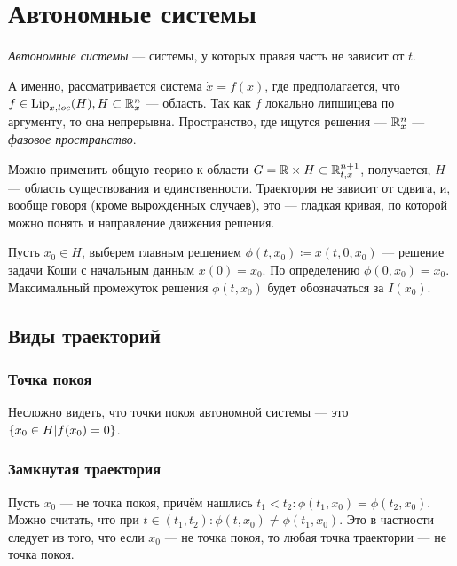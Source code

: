 \documentclass[a4paper]{report}
\begin{document}
    \chapter{Автономные системы}
    \emph{Автономные системы} --- системы, у которых правая часть не зависит от $t$.

    А именно, рассматривается система $\dot{x} = f(x)$, где предполагается, что $f \in \operatorname{Lip}_{x,loc}(H), H \subset \mathbb{R}_x^n$ --- область.
    Так как $f$ локально липшицева по аргументу, то она непрерывна.
    Пространство, где ищутся решения --- $\mathbb{R}^n_x$ --- \emph{фазовое пространство}.

    Можно применить общую теорию к области $G = \mathbb{R} \times H \subset \mathbb{R}_{t,x}^{n + 1}$, получается, $H$ --- область существования и единственности.
    Траектория не зависит от сдвига, и, вообще говоря (кроме вырожденных случаев), это --- гладкая кривая, по которой можно понять и направление движения решения.

    Пусть $x_0 \in H$, выберем главным решением $\phi(t, x_0) \coloneqq x(t, 0, x_0)$ --- решение задачи Коши с начальным данным $x(0) = x_0$.
    По определению $\phi(0, x_0) = x_0$.
    Максимальный промежуток решения $\phi(t, x_0)$ будет обозначаться за $I(x_0)$.
    \section{Виды траекторий}
    \subsection{Точка покоя}
    Несложно видеть, что точки покоя автономной системы --- это $\left\{x_0 \in H\middle|f(x_0) = 0\right\}$.
    \subsection{Замкнутая траектория}
    Пусть $x_0$ --- не точка покоя, причём нашлись $t_1 < t_2: \phi(t_1, x_0) = \phi(t_2, x_0)$.
    Можно считать, что при $t \in (t_1, t_2): \phi(t, x_0) \ne \phi(t_1, x_0)$.
    Это в частности следует из того, что если $x_0$ --- не точка покоя, то любая точка траектории --- не точка покоя.
\end{document}

